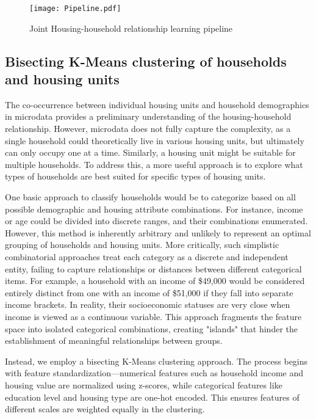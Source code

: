 \documentclass[]{nature_mod}
\begin{document}
\begin{figure}[!ht]
  \centering
  \texttt{[image: Pipeline.pdf]}
  \caption{Joint Housing-household relationship learning pipeline}
  \label{fig:pipeline}
\end{figure}

\subsection{Bisecting K-Means clustering of households and housing units}\label{sec:bisect-cluster}

The co-occurrence between individual housing units and household demographics in microdata provides a preliminary understanding of the housing-household relationship. However, microdata does not fully capture the complexity, as a single household could theoretically live in various housing units, but ultimately can only occupy one at a time. Similarly, a housing unit might be suitable for multiple households. To address this, a more useful approach is to explore what types of households are best suited for specific types of housing units.

One basic approach to classify households would be to categorize based on all possible demographic and housing attribute combinations. For instance, income or age could be divided into discrete ranges, and their combinations enumerated. However, this method is inherently arbitrary and unlikely to represent an optimal grouping of households and housing units. More critically, such simplistic combinatorial approaches treat each category as a discrete and independent entity, failing to capture relationships or distances between different categorical items. For example, a household with an income of \$49,000 would be considered entirely distinct from one with an income of \$51,000 if they fall into separate income brackets. In reality, their socioeconomic statuses are very close when income is viewed as a continuous variable. This approach fragments the feature space into isolated categorical combinations, creating "islands" that hinder the establishment of meaningful relationships between groups.

Instead, we employ a bisecting K-Means clustering approach. The process begins with feature standardization—numerical features such as household income and housing value are normalized using z-scores, while categorical features like education level and housing type are one-hot encoded. This ensures features of different scales are weighted equally in the clustering. 
\end{document}
